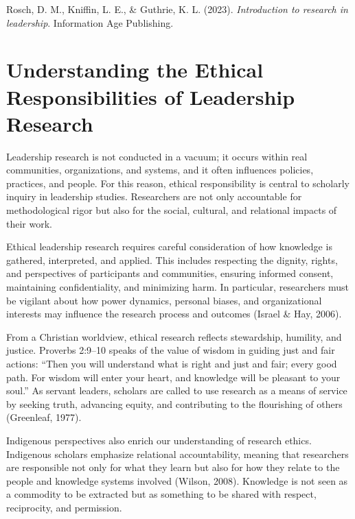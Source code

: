 \documentclass[
  letterpaper,
  DIV=11,
  numbers=noendperiod]{scrreprt}
\begin{document}
Rosch, D. M., Kniffin, L. E., \& Guthrie, K. L. (2023).
\emph{Introduction to research in leadership}. Information Age
Publishing.


\chapter*{Understanding the Ethical Responsibilities of Leadership
Research}\label{understanding-the-ethical-responsibilities-of-leadership-research}


Leadership research is not conducted in a vacuum; it occurs within real
communities, organizations, and systems, and it often influences
policies, practices, and people. For this reason, ethical responsibility
is central to scholarly inquiry in leadership studies. Researchers are
not only accountable for methodological rigor but also for the social,
cultural, and relational impacts of their work.

Ethical leadership research requires careful consideration of how
knowledge is gathered, interpreted, and applied. This includes
respecting the dignity, rights, and perspectives of participants and
communities, ensuring informed consent, maintaining confidentiality, and
minimizing harm. In particular, researchers must be vigilant about how
power dynamics, personal biases, and organizational interests may
influence the research process and outcomes (Israel \& Hay, 2006).

From a Christian worldview, ethical research reflects stewardship,
humility, and justice. Proverbs 2:9--10 speaks of the value of wisdom in
guiding just and fair actions: ``Then you will understand what is right
and just and fair; every good path. For wisdom will enter your heart,
and knowledge will be pleasant to your soul.'' As servant leaders,
scholars are called to use research as a means of service by seeking
truth, advancing equity, and contributing to the flourishing of others
(Greenleaf, 1977).

Indigenous perspectives also enrich our understanding of research
ethics. Indigenous scholars emphasize relational accountability, meaning
that researchers are responsible not only for what they learn but also
for how they relate to the people and knowledge systems involved
(Wilson, 2008). Knowledge is not seen as a commodity to be extracted but
as something to be shared with respect, reciprocity, and permission.
\end{document}
